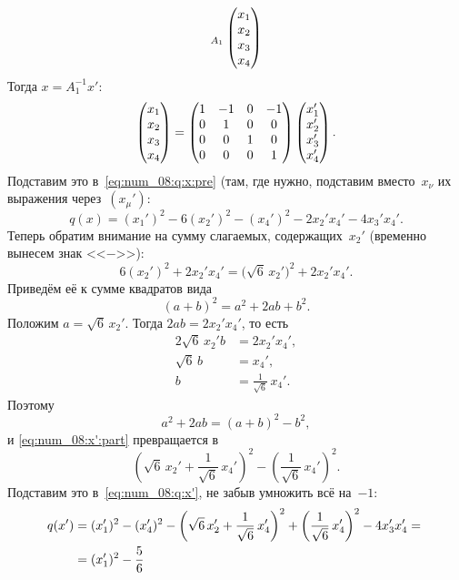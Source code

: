 \begin{solution}
\begin{align*}
{		}_{A_1}
		\begin{pmatrix}
			x_1 \\ x_2 \\ x_3 \\ x_4
		\end{pmatrix}
	\end{align*}
	Тогда $x = A_1^{-1} x'$:
	\[
		\begin{pmatrix}
			x_1 \\ x_2 \\ x_3 \\ x_4
		\end{pmatrix}
		=
		\begin{pmatrix}
			1 & -1 & 0 & -1
			\\
			0 & 1 & 0 & 0
			\\
			0 & 0 & 1 & 0
			\\
			0 & 0 & 0 & 1
		\end{pmatrix}
		\begin{pmatrix}
			x_1' \\ x_2' \\ x_3' \\ x_4'
		\end{pmatrix}
		.
	\]
	Подставим это в~\eqref{eq:num_08:q:x:pre} (там, где нужно, подставим вместо~$x_\nu$ их выражения через~$(x_\mu')$:
	\begin{equation}
		\label{eq:num_08:q:x'}
		q(x) =
		(x_1')^2
		- 6(x_2')^2
		- (x_4')^2
		-
		2 x_2' x_4'
		-
		4 x_3' x_4'
		.
	\end{equation}
	Теперь обратим внимание на сумму слагаемых, содержащих~$x_2'$ (временно вынесем знак <<$-$>>):
	\begin{equation}
		\label{eq:num_08:x':part}
		6(x_2')^2 + 2x_2'x_4'
		=
		\bigl( \sqrt{6}\,x_2' \bigr)^2 + 2x_2'x_4'
		.
	\end{equation}
	Приведём её к сумме квадратов вида
	\[
		(a+b)^2 = a^2 + 2ab + b^2
		.
	\]
	Положим $a = \sqrt{6}\,x_2'$. Тогда $2ab = 2x_2' x_4'$, то есть
	\begin{align*}
		2\sqrt{6}\,x_2' b &= 2x_2' x_4'
		,
		\\
		\sqrt{6}\, b &= x_4'
		,
		\\
		b &= \frac{1}{\sqrt{6}}\,x_4'
		.
	\end{align*}
	Поэтому
	\[
		a^2 + 2ab = (a+b)^2 - b^2
		,
	\]
	и \eqref{eq:num_08:x':part} превращается в
	\[
		\left( 
			\sqrt{6}\,x_2' +
			\frac{1}{\sqrt{6}}\,x_4'
		\right)^2
		-
		\left( 
			\frac{1}{\sqrt{6}}\,x_4'
		\right)^2
		.
	\]
	Подставим это в~\eqref{eq:num_08:q:x'}, не забыв умножить всё на~$-1$:
	\begin{align*}
		q(x') &=
		(x_1')^2
		- (x_4')^2
		-
		\left( 
			\sqrt{6}\,x_2' +
			\frac{1}{\sqrt{6}}\,x_4'
		\right)^2
		+
		\left( 
			\frac{1}{\sqrt{6}}\,
			x_4'
		\right)^2
		-
		4 x_3' x_4'
		\nlinea{=}
		(x_1')^2
		- 
		\frac{5}{6}\,

\end{align*}
\end{solution}
